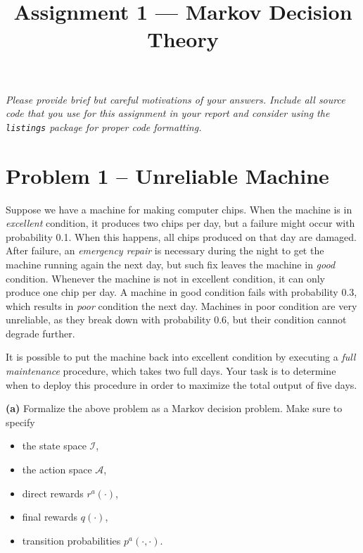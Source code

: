 \documentclass{article}
\title{Assignment 1 --- Markov Decision Theory}
\author{}
\date{}
\begin{document}
\maketitle
\vspace{-5em}

\noindent
\textit{Please provide brief but careful motivations of your answers. Include all source code that you use for this assignment in your report and consider using the \texttt{listings} package for proper code formatting.}

\section*{Problem 1 -- Unreliable Machine}

Suppose we have a machine for making computer chips.
When the machine is in \textit{excellent} condition, it produces two chips per day, but
a failure might occur with probability 0.1. 
When this happens, all chips produced on that day are damaged.
After failure, an \textit{emergency repair} is necessary during the night to get the machine running again the next day, but such fix leaves the machine in \textit{good} condition.
Whenever the machine is not in excellent condition, it can only produce one chip per day.
A machine in good condition fails with probability 0.3, which results in \textit{poor} condition the next day.
Machines in poor condition are very unreliable, as they break down with probability 0.6, but their condition cannot degrade further.

It is possible to put the machine back into excellent condition by executing a \textit{full maintenance} procedure, which takes two full days.
Your task is to determine when to deploy this procedure in order to maximize the total output of five days.


\vspace{1em}
\noindent
\textbf{(a)}
Formalize the above problem as a Markov decision problem. Make sure to specify
\begin{itemize}
    \item the state space $\mathcal{I}$,
    \item the action space $\mathcal{A}$,
    \item direct rewards $r^{a}(\cdot)$,
    \item final rewards $q(\cdot)$,
    \item transition probabilities $p^{a}(\cdot, \cdot)$.
\end{itemize}
\end{document}

